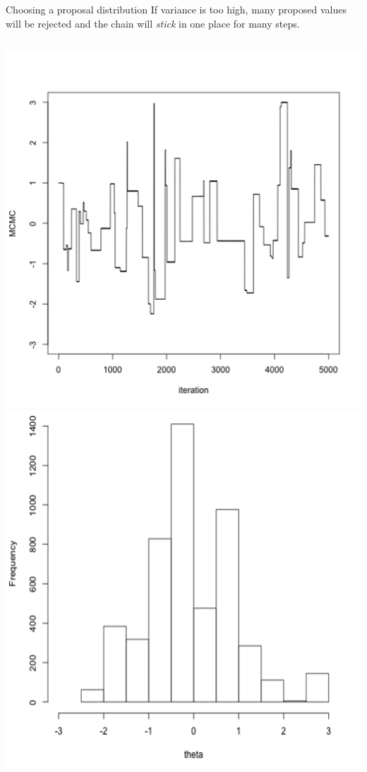 \documentclass[compress]{beamer}
\begin{document}
\begin{frame}[label=sec-8-4]{Choosing a proposal distribution}
    If \alert{variance is too high}, many proposed values will be rejected and the chain will \textit{stick} in one place for many steps.
    \begin{columns}[c] 
    \includegraphics[width=0.8\linewidth]{Var2}
    \includegraphics[width=0.8\linewidth]{Trace2}
\end{columns}  
\end{frame}
\end{document}
